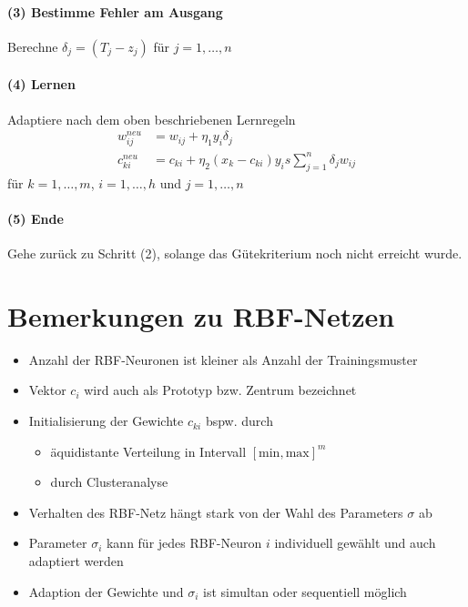 \paragraph{(3) Bestimme Fehler am Ausgang}
Berechne $\delta_j = (T_j - z_j)$ für $j=1,\dots,n$

\paragraph{(4) Lernen}
Adaptiere nach dem oben beschriebenen Lernregeln
\begin{align*}
    w_{ij}^{neu} &= w_{ij} +\eta_1y_i\delta_j\\
    c_{ki}^{neu} &= c_{ki} + \eta_2(x_k-c_{ki})y_is\sum_{j=1}^n\delta_jw_{ij}
\end{align*}
für $k=1,\dots,m$, $i=1,\dots,h$ und $j=1,\dots,n$

\paragraph{(5) Ende}
Gehe zurück zu Schritt (2), solange das Gütekriterium noch nicht erreicht wurde.

\section{Bemerkungen zu RBF-Netzen}
\begin{itemize}
    \item Anzahl der RBF-Neuronen ist kleiner als Anzahl der Trainingsmuster
    \item Vektor $c_i$ wird auch als Prototyp bzw. Zentrum bezeichnet
    \item Initialisierung der Gewichte $c_{ki}$ bspw. durch
        \begin{itemize}
            \item äquidistante Verteilung in Intervall $[\text{min},\text{max}]^m$
            \item durch Clusteranalyse
        \end{itemize}
    \item Verhalten des RBF-Netz hängt stark von der Wahl des Parameters $\sigma$ ab
    \item Parameter $\sigma_i$ kann für jedes RBF-Neuron $i$ individuell gewählt und auch adaptiert werden
    \item Adaption der Gewichte und $\sigma_i$ ist simultan oder sequentiell möglich
\end{itemize}

